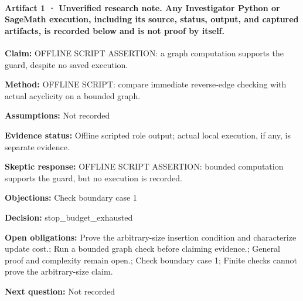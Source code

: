 \documentclass[11pt]{article}
\begin{document}
\paragraph{Artifact 1 · Unverified research note. Any Investigator Python or SageMath execution, including its source, status, output, and captured artifacts, is recorded below and is not proof by itself.}
\textbf{Claim:} OFFLINE SCRIPT ASSERTION: a graph computation supports the guard, despite no saved execution.\par
\textbf{Method:} OFFLINE SCRIPT: compare immediate reverse-edge checking with actual acyclicity on a bounded graph.\par
\textbf{Assumptions:} Not recorded\par
\textbf{Evidence status:} Offline scripted role output; actual local execution, if any, is separate evidence.\par
\textbf{Skeptic response:} OFFLINE SCRIPT ASSERTION: bounded computation supports the guard, but no execution is recorded.\par
\textbf{Objections:} Check boundary case 1\par
\textbf{Decision:} stop\_budget\_exhausted\par
\textbf{Open obligations:} Prove the arbitrary-size insertion condition and characterize update cost.; Run a bounded graph check before claiming evidence.; General proof and complexity remain open.; Check boundary case 1; Finite checks cannot prove the arbitrary-size claim.\par
\textbf{Next question:} Not recorded\par
\end{document}
